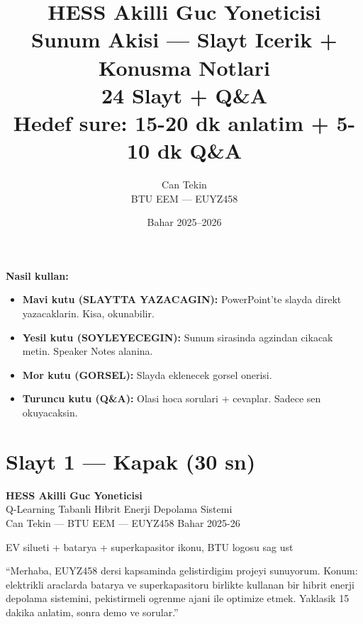 \documentclass[11pt,a4paper]{article}
\title{
  \vspace{-1.2cm}
  \textbf{\Huge HESS Akilli Guc Yoneticisi}\\[0.4em]
  {\Large Sunum Akisi --- Slayt Icerik + Konusma Notlari}\\[0.4em]
  {\large 24 Slayt + Q\&A}\\[1em]
  {\normalsize Hedef sure: 15-20 dk anlatim + 5-10 dk Q\&A}
}
\author{Can Tekin \\ \small BTU EEM --- EUYZ458}
\date{Bahar 2025--2026}
\begin{document}
\maketitle
\thispagestyle{empty}

\begin{tcolorbox}[colback=yellow!8,colframe=yellow!50!black,boxrule=0.4pt]
\textbf{Nasil kullan:}
\begin{itemize}
\item \textcolor{blue!50!black}{\textbf{Mavi kutu (SLAYTTA YAZACAGIN):}} PowerPoint'te slayda direkt yazacaklarin. Kisa, okunabilir.
\item \textcolor{green!50!black}{\textbf{Yesil kutu (SOYLEYECEGIN):}} Sunum sirasinda agzindan cikacak metin. Speaker Notes alanina.
\item \textcolor{purple!50!black}{\textbf{Mor kutu (GORSEL):}} Slayda eklenecek gorsel onerisi.
\item \textcolor{orange!60!black}{\textbf{Turuncu kutu (Q\&A):}} Olasi hoca sorulari + cevaplar. Sadece sen okuyacaksin.
\end{itemize}
\end{tcolorbox}

\tableofcontents
\newpage

\section{Slayt 1 --- Kapak (30 sn)}

\begin{slytboks}
\textbf{HESS Akilli Guc Yoneticisi}\\[0.3em]
Q-Learning Tabanli Hibrit Enerji Depolama Sistemi\\[0.3em]
Can Tekin --- BTU EEM --- EUYZ458 Bahar 2025-26
\end{slytboks}

\begin{gorselboks}
EV silueti + batarya + superkapasitor ikonu, BTU logosu sag ust
\end{gorselboks}

\begin{sayboks}
``Merhaba, EUYZ458 dersi kapsaminda gelistirdigim projeyi sunuyorum. Konum: elektrikli araclarda batarya ve superkapasitoru birlikte kullanan bir hibrit enerji depolama sistemini, pekistirmeli ogrenme ajani ile optimize etmek. Yaklasik 15 dakika anlatim, sonra demo ve sorular.''
\end{sayboks}
\end{document}
